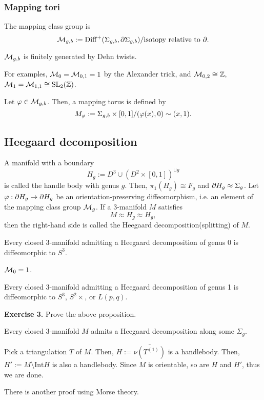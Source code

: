 \documentclass{../../../small}
\begin{document}
\subsubsection*{Mapping tori}
The mapping class group is
\[\cM_{g,b}:=\mathrm{Diff}^+(\Sigma_{g,b},\pd\Sigma_{g,b})/\text{isotopy relative to }\pd.\]

\begin{thm}
$\mathcal{M}_{g,b}$ is finitely generated by Dehn twists.
\end{thm}
For examples, $\mathcal{M}_0=\mathcal{M}_{0,1}=1$ by the Alexander trick, and $\mathcal{M}_{0,2}\cong\mathbb{Z}$, $\mathcal{M}_1=\mathcal{M}_{1,1}\cong\mathrm{SL}_2(\mathbb{Z})$.

Let $\varphi\in\mathcal{M}_{g,b}$.
Then, a mapping torus is defined by
\[M_\varphi:=\Sigma_{g,b}\times[0,1]/(\varphi(x),0)\sim(x,1).\]

\subsection{Heegaard decomposition}

A manifold with a boundary
\[H_g:=D^3\cup(D^2\times[0,1])^{\sqcup g}\]
is called the handle body with genus $g$.
Then, $\pi_1(H_g)\cong F_g$ and $\pd H_g\approx\Sigma_g$.
Let $\f:\pd H_g\to\pd H_g$ be an orientation-preserving diffeomorphism, i.e. an element of the mapping class group $\mathcal{M}_g$.
If a 3-manifold $M$ satisfies
\[M\approx H_g\approx H_g,\]
then the right-hand side is called the Heegaard decomposition(splitting) of $M$.
\begin{prop}
Every closed 3-manifold admitting a Heegaard decomposition of genus 0 is diffeomorphic to $S^3$.
\end{prop}
\begin{pf}
$\mathcal{M}_0=1$.
\end{pf}
\begin{prop}
Every closed 3-manifold admitting a Heegaard decomposition of genus 1 is diffeomorphic to $S^3$, $S^2\times$, or $L(p,q)$.
\end{prop}
\textbf{Exercise 3.} Prove the above proposition.
\begin{thm}
Every closed 3-manifold $M$ admits a Heegaard decomposition along some $\Sigma_g$.
\end{thm}
\begin{pf}
Pick a triangulation $T$ of $M$.
Then, $H:=\bar{\nu(T^{(1)})}$ is a handlebody.
Then, $H':=M\setminus\mathrm{Int}H$ is also a handlebody.
Since $M$ is orientable, so are $H$ and $H'$, thus we are done.
\end{pf}
There is another proof using Morse theory.
\end{document}
